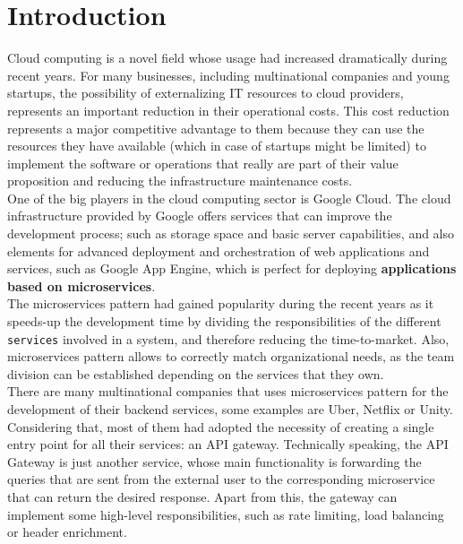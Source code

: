\documentclass[12pt]{article}
\begin{document}
\section{Introduction}

Cloud computing is a novel field whose usage had increased dramatically during recent years. For many businesses, including multinational companies and young startups, the possibility of externalizing IT resources to cloud providers, represents an important reduction in their operational costs. This cost reduction represents a major competitive advantage to them because they can use the resources they have available (which in case of startups might be limited) to implement the software or operations that really are part of their value proposition and reducing the infrastructure maintenance costs.\\

One of the big players in the cloud computing sector is Google Cloud. The cloud infrastructure provided by Google offers services that can improve the development process; such as storage space and basic server capabilities, and also elements for advanced deployment and orchestration of web applications and services, such as Google App Engine, which is perfect for deploying \textbf{applications based on microservices}.\\

The microservices pattern had gained popularity during the recent years as it speeds-up the development time by dividing the responsibilities of the different \texttt{services} involved in a system, and therefore reducing the time-to-market. Also, microservices pattern allows to correctly match organizational needs, as the team division can be established depending on the services that they own.\\

There are many multinational companies that uses microservices pattern for the development of their backend services, some examples are Uber, Netflix or Unity. Considering that, most of them had adopted the necessity of creating a single entry point for all their services: an API gateway. Technically speaking, the API Gateway is just another service, whose main functionality is forwarding the queries that are sent from the external user to the corresponding microservice that can return the desired response. Apart from this, the gateway can implement some high-level responsibilities, such as rate limiting, load balancing or header enrichment.\\
\end{document}
